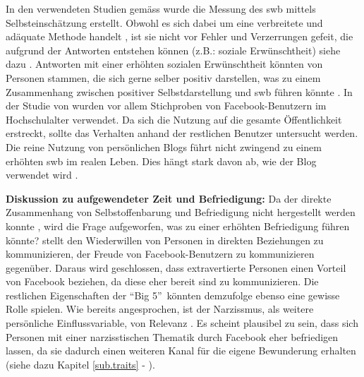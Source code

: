 In den verwendeten Studien gemäss  wurde die Messung des \gls{swb} mittels Selbsteinschätzung erstellt. Obwohl es sich dabei um eine verbreitete und adäquate Methode handelt \cite{Diener:1994}, ist sie nicht vor Fehler und Verzerrungen gefeit, die aufgrund der Antworten entstehen können (z.B.: soziale Erwünschtheit) siehe dazu . Antworten mit einer erhöhten sozialen Erwünschtheit könnten von Personen stammen, die sich gerne selber positiv darstellen, was zu einem Zusammenhang zwischen positiver Selbstdarstellung und \gls{swb} führen könnte \cite{Diener:1991}.\newline
In der Studie von  wurden vor allem Stichproben von Facebook-Benutzern im Hochschulalter verwendet. Da sich die Nutzung auf die gesamte Öffentlichkeit erstreckt, sollte das Verhalten anhand der restlichen Benutzer untersucht werden.\newline
Die reine Nutzung von persönlichen Blogs führt nicht zwingend zu einem erhöhten \gls{swb} im realen Leben. Dies hängt stark davon ab, wie der Blog verwendet wird \cite{Jung:2012}.\par 

\textbf{Diskussion zu aufgewendeter Zeit und Befriedigung:}\newline
Da der direkte Zusammenhang von Selbstoffenbarung und Befriedigung nicht hergestellt werden konnte \cite{Special:2012}, wird die Frage aufgeworfen, was zu einer erhöhten Befriedigung führen könnte?  stellt den Wiederwillen von Personen in direkten Beziehungen zu kommunizieren, der Freude von Facebook-Benutzern zu kommunizieren gegenüber. Daraus wird geschlossen, dass extravertierte Personen einen Vorteil von Facebook beziehen, da diese eher bereit sind zu kommunizieren. Die restlichen Eigenschaften der \textquotedblleft Big 5\textquotedblright \ könnten demzufolge ebenso eine gewisse Rolle spielen.\newline
Wie bereits angesprochen, ist der Narzissmus, als weitere persönliche Einflussvariable, von Relevanz \cite{Special:2012,Amichai:2002}. Es scheint plausibel zu sein, dass sich Personen mit einer narzisstischen Thematik durch Facebook eher befriedigen lassen, da sie dadurch einen weiteren Kanal für die eigene Bewunderung erhalten (siehe dazu Kapitel \ref{sub.traits} - ).\par 

